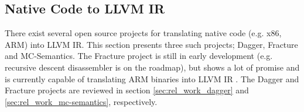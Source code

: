 
\subsection{Native Code to LLVM IR}
\label{sec:rel_work_native_code_to_llvm_ir}

There exist several open source projects for translating native code (e.g. x86, ARM) into LLVM IR. This section presents three such projects; Dagger, Fracture and MC-Semantics. The Fracture project is still in early development (e.g. recursive descent disassembler is on the roadmap), but shows a lot of promise and is currently capable of translating ARM binaries into LLVM IR \cite{fracture}. The Dagger and Fracture projects are reviewed in section \ref{sec:rel_work_dagger} and \ref{sec:rel_work_mc-semantics}, respectively.




